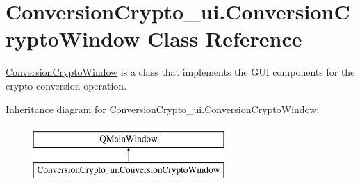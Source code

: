 \hypertarget{class_conversion_crypto__ui_1_1_conversion_crypto_window}{}\section{Conversion\+Crypto\+\_\+ui.\+Conversion\+Crypto\+Window Class Reference}
\label{class_conversion_crypto__ui_1_1_conversion_crypto_window}


\hyperlink{class_conversion_crypto__ui_1_1_conversion_crypto_window}{Conversion\+Crypto\+Window} is a class that implements the G\+UI components for the crypto conversion operation.  


Inheritance diagram for Conversion\+Crypto\+\_\+ui.\+Conversion\+Crypto\+Window\+:\begin{figure}[H]
\begin{center}
\leavevmode
\includegraphics[height=2.000000cm]{class_conversion_crypto__ui_1_1_conversion_crypto_window}
\end{center}
\end{figure}
